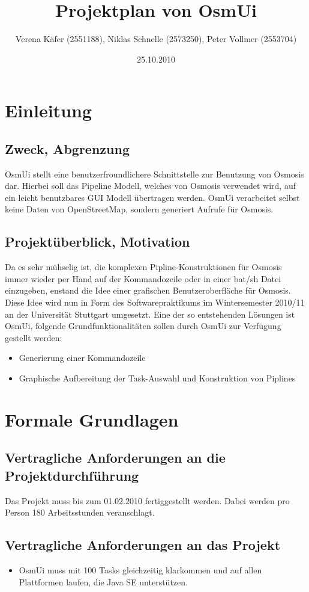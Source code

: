 \documentclass[a4paper,10pt]{scrartcl}
\author{Verena Käfer (2551188), Niklas Schnelle (2573250), Peter Vollmer (2553704)}
\date{25.10.2010}
\title{Projektplan von OsmUi}
\begin{document}
\maketitle
\newpage
\tableofcontents
\newpage


\section{Einleitung}
\subsection{Zweck, Abgrenzung}
OsmUi stellt eine benutzerfroundlichere Schnittstelle zur Benutzung von Osmosis dar. Hierbei soll das Pipeline Modell, welches von Osmosis verwendet wird, auf ein leicht benutzbares GUI Modell übertragen werden.
OsmUi verarbeitet selbst keine Daten von OpenStreetMap, sondern generiert Aufrufe für Osmosis. 
\subsection{Projektüberblick, Motivation}
Da es sehr mühselig ist, die komplexen Pipline-Konstruktionen für Osmosis immer wieder per Hand auf der Kommandozeile oder in einer bat/sh Datei einzugeben, 
enstand die Idee einer grafischen Benutzeroberfläche für Osmosis.
Diese Idee wird nun in Form des Softwarepraktikums im Wintersemester 2010/11 an der Universität Stuttgart umgesetzt.
Eine der so entstehenden Lösungen ist OsmUi, folgende Grundfunktionalitäten sollen durch OsmUi zur Verfügung gestellt werden:
\begin{itemize}
\item Generierung einer Kommandozeile
\item Graphische Aufbereitung der Task-Auswahl und Konstruktion von Piplines
\end{itemize}

\section{Formale Grundlagen}
\subsection{Vertragliche Anforderungen an die Projektdurchführung}
Das Projekt muss bis zum 01.02.2010 fertiggestellt werden. Dabei werden pro Person 180 Arbeitsstunden veranschlagt.
\subsection{Vertragliche Anforderungen an das Projekt}
\begin{itemize}
\item OsmUi muss mit 100 Tasks gleichzeitig klarkommen und auf allen Plattformen laufen, die Java SE unterstützen.  
\end{itemize}
\end{document}
